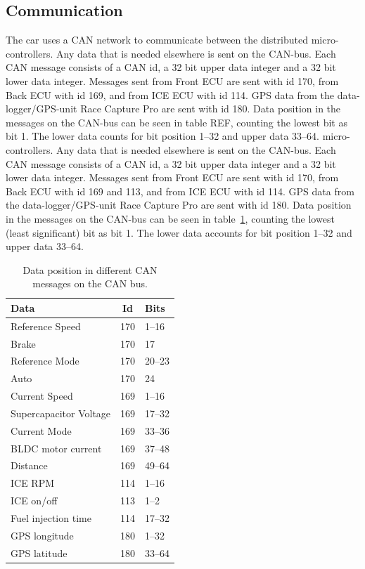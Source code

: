 \subsection{Communication}
The car uses a CAN network to communicate between the distributed
micro-controllers. Any data that is needed elsewhere is sent on the CAN-bus.
Each CAN message consists of a CAN id, a 32 bit upper data integer and a 32 bit
lower data integer. Messages sent from Front ECU are sent with id 170, from
Back ECU with id 169, and from ICE ECU with id 114. GPS data from the
data-logger/GPS-unit Race Capture Pro are sent with id 180. Data position in
the messages on the CAN-bus can be seen in table REF, counting the lowest bit
as bit 1. The lower data counts for bit position 1--32 and upper data 33--64.
micro-controllers. Any data that is needed elsewhere is sent on the CAN-bus.
Each CAN message consists of a CAN id, a 32 bit upper data integer and a 32 bit
lower data integer. Messages sent from Front ECU are sent with id 170, from Back
ECU with id 169 and 113, and from ICE ECU with id 114. GPS data from the
data-logger/GPS-unit Race Capture Pro are sent with id 180. Data position in the
messages on the CAN-bus can be seen in table~\ref{table:CAN}, counting the
lowest (least significant) bit as bit 1. The lower data accounts for bit
position 1--32 and upper data 33--64.

\begin{table}[H]
\label{table:CAN}
\begin{center}
\begin{tabular}{lcl}
\textbf{Data} & \textbf{Id} & \textbf{Bits}\\
\toprule
Reference Speed & 170 & 1--16 \\
Brake & 170 & 17 \\
Reference Mode & 170 & 20--23 \\
Auto & 170 & 24 \\
Current Speed & 169 & 1--16 \\
Supercapacitor Voltage & 169 & 17--32 \\ 
Current Mode & 169 & 33--36 \\ 
BLDC motor current & 169 & 37--48 \\
Distance & 169 & 49--64 \\
ICE RPM & 114 & 1--16 \\
ICE on/off & 113 & 1--2 \\
Fuel injection time & 114 & 17--32 \\
GPS longitude & 180 & 1--32 \\ 
GPS latitude & 180 & 33--64 \\
\bottomrule
\end{tabular}
\end{center}
\caption{Data position in different CAN messages on the CAN bus.}
\end{table}

